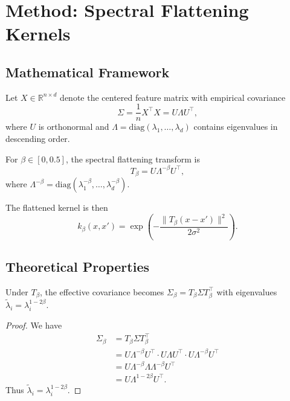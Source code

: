 \documentclass[11pt]{article}
\begin{document}
\section{Method: Spectral Flattening Kernels}

\subsection{Mathematical Framework}

Let $X \in \mathbb{R}^{n \times d}$ denote the centered feature matrix with empirical covariance
\begin{equation}
    \Sigma = \frac{1}{n} X^\top X = U \Lambda U^\top,
\end{equation}
where $U$ is orthonormal and $\Lambda = \text{diag}(\lambda_1, \ldots, \lambda_d)$ contains eigenvalues in descending order.

\begin{definition}
For $\beta \in [0, 0.5]$, the spectral flattening transform is
\begin{equation}
    T_\beta = U \Lambda^{-\beta} U^\top,
\end{equation}
where $\Lambda^{-\beta} = \text{diag}(\lambda_1^{-\beta}, \ldots, \lambda_d^{-\beta})$.
\end{definition}

The flattened kernel is then
\begin{equation}
    k_\beta(x, x') = \exp\left(-\frac{\|T_\beta(x - x')\|^2}{2\sigma^2}\right).
\end{equation}

\subsection{Theoretical Properties}

\begin{proposition}
Under $T_\beta$, the effective covariance becomes $\Sigma_\beta = T_\beta \Sigma T_\beta^\top$ with eigenvalues $\tilde{\lambda}_i = \lambda_i^{1-2\beta}$.
\end{proposition}

\begin{proof}
We have
\begin{align}
    \Sigma_\beta &= T_\beta \Sigma T_\beta^\top \\
    &= U \Lambda^{-\beta} U^\top \cdot U \Lambda U^\top \cdot U \Lambda^{-\beta} U^\top \\
    &= U \Lambda^{-\beta} \Lambda \Lambda^{-\beta} U^\top \\
    &= U \Lambda^{1-2\beta} U^\top.
\end{align}
Thus $\tilde{\lambda}_i = \lambda_i^{1-2\beta}$.
\end{proof}
\end{document}
